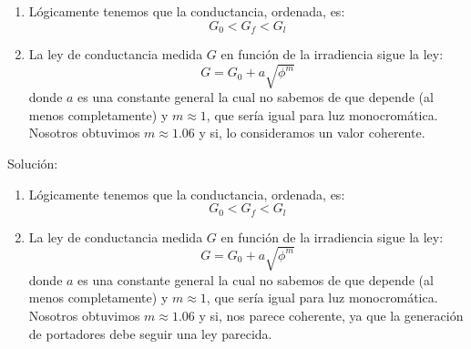 \begin{enumerate}[label=\alph*)]
	\item Lógicamente tenemos que la conductancia, ordenada, es:
	\[
	G_0 < G_f < G_l
	\]
	\item La ley de conductancia medida $G$ en función de la irradiencia sigue la ley: 
	\[
	G = G_0 + a \sqrt{\phi^{m}}
	\]
	donde $a$ es una constante general la cual no sabemos de que depende (al menos completamente) y $m\approx 1$, que sería igual para luz monocromática. Nosotros obtuvimos $m \approx 1.06$ y si, lo consideramos un valor coherente. 
\end{enumerate}


Solución:


\begin{enumerate}[label=\alph*)]
	\item Lógicamente tenemos que la conductancia, ordenada, es:
	\[
	G_0 < G_f < G_l
	\]
	\item La ley de conductancia medida $G$ en función de la irradiencia sigue la ley: 
	\[
	G = G_0 + a \sqrt{\phi^{m}}
	\]
	donde $a$ es una constante general la cual no sabemos de que depende (al menos completamente) y $m\approx 1$, que sería igual para luz monocromática. Nosotros obtuvimos $m \approx 1.06$ y si, nos parece coherente, ya que la generación de portadores debe seguir una ley parecida. 
\end{enumerate}

\vspace*{2em}


